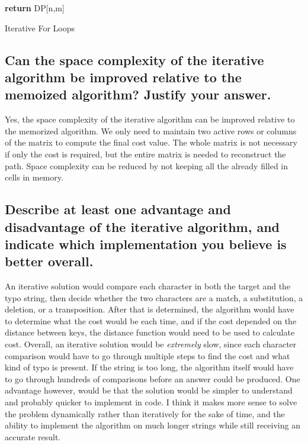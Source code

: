 \documentclass[letterpaper,12pt]{article}
\begin{document}
\begin{algorithm}

\textbf{return} {DP[n,m]}
\caption{Iterative For Loops}
\end{algorithm}

\subsection{Can the space complexity of the iterative algorithm be improved relative to the memoized algorithm? Justify your answer.}
{Yes, the space complexity of the iterative algorithm can be improved relative to the memorized algorithm. We only need to maintain two active rows or columns of the matrix to compute the final cost value. The whole matrix is not necessary if only the cost is required, but the entire matrix is needed to reconstruct the path. Space complexity can be reduced by not keeping all the already filled in cells in memory. }

\subsection{Describe at least one advantage and disadvantage of the iterative algorithm, and indicate which implementation you believe is better overall.}
{An iterative solution would compare each character in both the target and the typo string, then decide whether the two characters are a match, a substitution, a deletion, or a transposition. After that is determined, the algorithm would have to determine what the cost would be each time, and if the cost depended on the distance between keys, the distance function would need to be used to calculate cost. Overall, an iterative solution would be \textit{extremely} slow, since each character comparison would have to go through multiple steps to find the cost and what kind of typo is present. If the string is too long, the algorithm itself would have to go through hundreds of comparisons before an answer could be produced. \newline
One advantage however, would be that the solution would be simpler to understand and probably quicker to implement in code. I think it makes more sense to solve the problem dynamically rather than iteratively for the sake of time, and the ability to implement the algorithm on much longer strings while still receiving an accurate result.}
\end{document}
